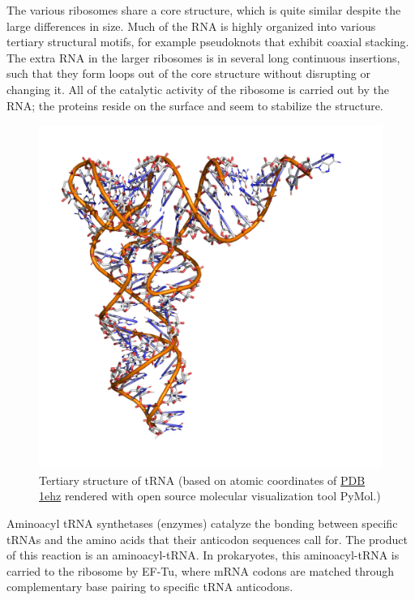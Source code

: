 The various ribosomes share a core structure, which is quite similar despite the large differences in size. Much of the RNA is highly organized into various tertiary structural motifs, for example pseudoknots that exhibit coaxial stacking. The extra RNA in the larger ribosomes is in several long continuous insertions, such that they form loops out of the core structure without disrupting or changing it. All of the catalytic activity of the ribosome is carried out by the RNA; the proteins reside on the surface and seem to stabilize the structure.



\begin{figure}

{\centering \includegraphics[width=0.7\linewidth]{./figures/translation/trna} 

}

\caption{Tertiary structure of tRNA (based on atomic coordinates of \href{https://www.rcsb.org/structure/1ehz}{PDB 1ehz} rendered with open source molecular visualization tool PyMol.)}\label{fig:trnastruc}
\end{figure}

Aminoacyl tRNA synthetases (enzymes) catalyze the bonding between specific tRNAs and the amino acids that their anticodon sequences call for. The product of this reaction is an aminoacyl-tRNA. In prokaryotes, this aminoacyl-tRNA is carried to the ribosome by EF-Tu, where mRNA codons are matched through complementary base pairing to specific tRNA anticodons.


